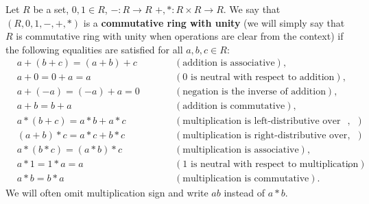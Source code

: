 \begin{definition}
  Let
    $R$ be a set,
    $0, 1 \in R$,
    $- \colon R \to R$
    $+, * \colon R \times R \to R$.
  We say that $(R, 0, 1, -, +, *)$ is a \textbf{commutative ring with unity}
  (we will simply say that $R$ is commutative ring with unity when operations
  are clear from the context) if the following equalities are satisfied
  for all $a, b, c \in R$:
  \begin{subequations}
    \begin{alignat}{2}
      & a + (b + c) = (a + b) + c \qquad
      && (\text{addition is associative}), \\
      & a + 0 = 0 + a = a \qquad
      && (\text{$0$ is neutral with respect to addition}), \\
      & a + (- a) = (- a) + a = 0 \qquad
      && (\text{negation is the inverse of addition}), \\
      & a + b = b + a \qquad
      && (\text{addition is commutative}), \\
      & a * (b + c) = a * b + a * c \qquad
      && (\text{multiplication is left-distributive over addition}), \\
      & (a + b) * c = a * c + b * c \qquad
      && (\text{multiplication is right-distributive over addition}), \\
      & a * (b * c) = (a * b) * c \qquad
      && (\text{multiplication is associative}), \\
      & a * 1 = 1 * a = a \qquad
      && (\text{$1$ is neutral with respect to multiplication}), \\
      & a * b = b * a \qquad
      && (\text{multiplication is commutative}).
    \end{alignat}
  \end{subequations}
  We will often omit multiplication sign and write $a b$ instead of $a * b$.
\end{definition}
